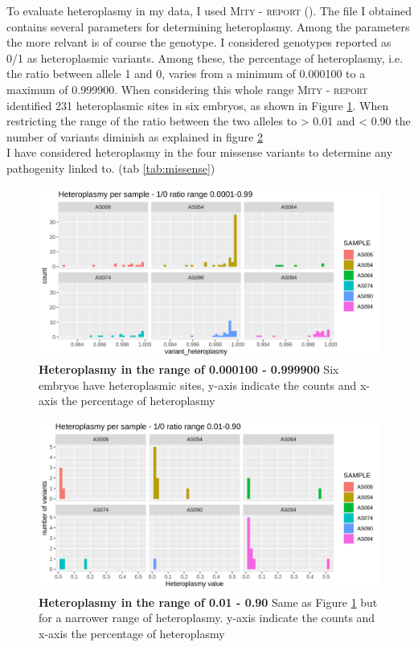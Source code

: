 To evaluate heteroplasmy in my data, I used \textsc{Mity - report} (\cite{puttick2019mity}). The file I obtained contains several parameters for determining heteroplasmy. Among the parameters the more relvant is of course the genotype. I considered genotypes reported as 0/1 as heteroplasmic variants. Among these, the percentage of heteroplasmy, i.e. the ratio between allele 1 and 0, varies from a minimum of 0.000100  to a maximum of 0.999900. When considering this whole range \textsc{Mity - report} identified 231 heteroplasmic sites in six embryos, as shown in Figure \ref{fig:distributionHet99}. When restricting the range of the ratio between the two alleles to  > 0.01 and < 0.90 the number of variants diminish as explained in figure \ref{fig:distribution90} \\ 

I have considered heteroplasmy in the four missense variants to determine any pathogenity linked to. (tab \ref{tab:missense}) \\



\begin{figure}[H]
\centering
\includegraphics[width=1\textwidth]{Fig/het99.png}
\decoRule
\caption{\textbf{Heteroplasmy in the range of 0.000100 - 0.999900} Six embryos have heteroplasmic sites, y-axis indicate the counts and x-axis the percentage of heteroplasmy } 
\label{fig:distributionHet99}
\end{figure}


\begin{figure}[H]
\centering
\includegraphics[width=1\textwidth]{Fig/het90.png}
\decoRule
\caption{\textbf{Heteroplasmy in the range of 0.01 - 0.90} Same as Figure \ref{fig:distributionHet99} but for a narrower range of heteroplasmy. y-axis indicate the counts and x-axis the percentage of heteroplasmy }
\label{fig:distribution90}
\end{figure}



